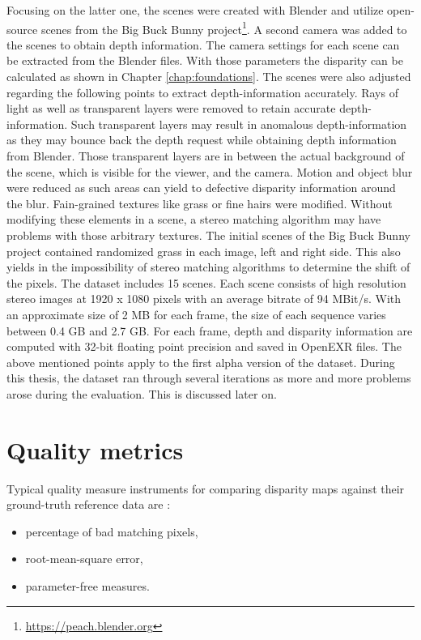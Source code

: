 \noindent Focusing on the latter one, the scenes were created with Blender and utilize open-source scenes from the Big Buck Bunny project\footnote{\url{https://peach.blender.org}}.
A second camera was added to the scenes to obtain depth information.
The camera settings for each scene can be extracted from the Blender files.
With those parameters the disparity can be calculated as shown in Chapter \ref{chap:foundations}.
The scenes were also adjusted regarding the following points to extract depth-information accurately.
Rays of light as well as transparent layers were removed to retain accurate depth-information.
Such transparent layers may result in anomalous depth-information as they may bounce back the depth request while obtaining depth information from Blender.
Those transparent layers are in between the actual background of the scene, which is visible for the viewer, and the camera.
Motion and object blur were reduced as such areas can yield to defective disparity information around the blur.
Fain-grained textures like grass or fine hairs were modified.
Without modifying these elements in a scene, a stereo matching algorithm may have problems with those arbitrary textures.
The initial scenes of the Big Buck Bunny project contained randomized grass in each image, left and right side.
This also yields in the impossibility of stereo matching algorithms to determine the shift of the pixels.
\newline\newline\noindent The dataset includes 15 scenes.
Each scene consists of high resolution stereo images at 1920 x 1080 pixels with an average bitrate of 94 MBit/s.
With an approximate size of 2 MB for each frame, the size of each sequence varies between 0.4 GB and 2.7 GB.
For each frame, depth and disparity information are computed with 32-bit floating point precision and saved in OpenEXR files.
The above mentioned points apply to the first alpha version of the dataset.
During this thesis, the dataset ran through several iterations as more and more problems arose during the evaluation.
This is discussed later on.

\section{Quality metrics}

Typical quality measure instruments for comparing disparity maps against their ground-truth reference data are  \citep{cyganek2011introduction}:

\begin{itemize}
  \item percentage of bad matching pixels,
  \item root-mean-square error,
  \item parameter-free measures.
\end{itemize}

